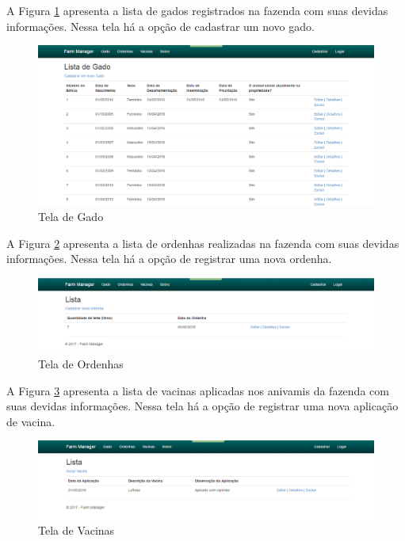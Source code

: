 A Figura \ref{tela-de-gado} apresenta a lista de gados registrados na fazenda com suas devidas informações. Nessa tela há a opção de cadastrar um novo gado.

\begin{landscape}
\begin{figure}[h!]
	\centering
	\includegraphics[keepaspectratio=true,scale= 0.5]{figuras/Index-FarmManager.png}
	\caption{Tela de Gado}
	\label{tela-de-gado}
\end{figure}
\end{landscape}

A Figura \ref{tela-de-ordenha} apresenta a lista de ordenhas realizadas na fazenda com suas devidas informações. Nessa tela há a opção de registrar uma nova ordenha.

\begin{landscape}
\begin{figure}[h!]
	\centering
	\includegraphics[keepaspectratio=true,scale= 0.7]{figuras/Ordenha-FarmManager.PNG}
	\caption{Tela de Ordenhas}
	\label{tela-de-ordenha}
\end{figure}
\end{landscape}

A Figura \ref{tela-de-vacina} apresenta a lista de vacinas aplicadas nos anivamis da fazenda com suas devidas informações. Nessa tela há a opção de registrar uma nova aplicação de vacina.

\begin{landscape}
\begin{figure}[h!]
	\centering
	\includegraphics[keepaspectratio=true,scale= 0.5]{figuras/Vacina-FarmManager.png}
	\caption{Tela de Vacinas}
	\label{tela-de-vacina}
\end{figure}
\end{landscape}

